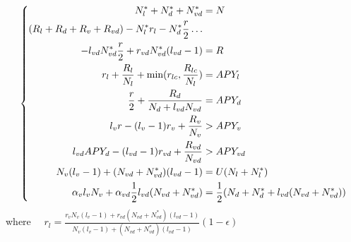\documentclass{article}
\begin{document}
\begin{equation}
    \left\{
    \begin{aligned}
    N_l^* + N_d^* + N_{vd}^* &= N \\
    (R_l+R_d+R_v+R_{vd}) - N_l^* r_l - N_d^* \frac{r}{2} \dots\\
    - l_{vd} N_{vd}^* \frac{r}{2} + r_{vd} N_{vd}^* (l_{vd}-1) &= R\\
   r_l + \frac{R_l}{N_l} + \text{min}(r_{lc}, \frac{R_{lc}}{N_l}) &=APY_l\\
    \frac{r}{2}+\frac{R_d}{N_d+l_{vd}N_{vd}} &=APY_d\\
    l_v \space r - (l_v-1)r_v + \frac{R_v}{N_v} &>APY_v\\
    l_{vd} APY_d - (l_{vd}-1)r_{vd} + \frac{R_{vd}}{N_{vd}} &>APY_{vd} \\
    N_{v}(l_{v}-1) + (N_{vd}+N_{vd}^*)(l_{vd}-1) &= U(N_l+N_l^*) \\
    \alpha_v l_v N_v + \alpha_{vd} \frac{1}{2} l_{vd} (N_{vd}+N_{vd}^*) &=
    \frac{1}{2}(N_d + N_d^* +  l_{vd} (N_{vd}+N_{vd}^*))
    \end{aligned}
    \right.
\end{equation}
where $\quad r_l = \frac{r_v N_v(l_v-1)+r_{vd} (N_{vd}+N_{vd}^*)(l_{vd}-1)}{N_v(l_v-1)+(N_{vd}+N_{vd}^*)(l_{vd}-1)}(1-\epsilon)$
\end{document}
